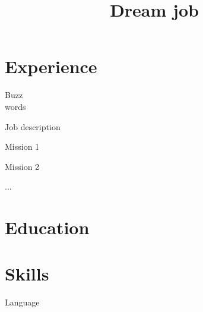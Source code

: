 \documentclass[a4paper,11pt]{cv4tw}%
\title{Dream job}
\begin{document}
\section{Experience}
{Buzz\\words}
	{ Job description
	\begin{cvmissions}
		\item Mission 1
		\item Mission 2
		\item ...
	\end{cvmissions}
}
\section{Education}
\section{Skills}
\begin{cvskills} {Language}
\end{cvskills}
\end{document}

